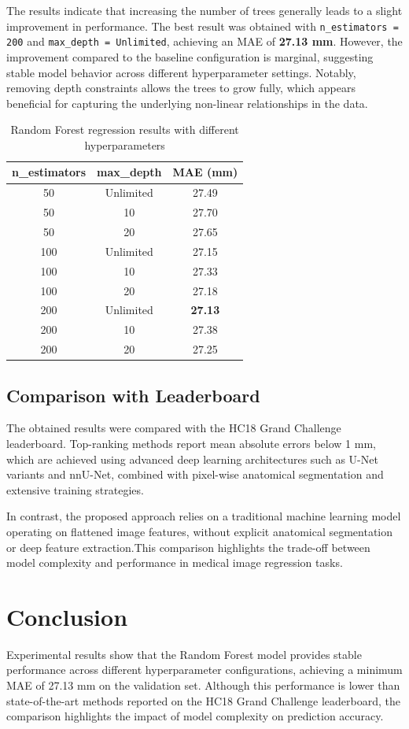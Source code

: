 \documentclass{IEEEtran}
\begin{document}
The results indicate that increasing the number of trees generally leads to a slight improvement in performance. The best result was obtained with \texttt{n\_estimators = 200} and \texttt{max\_depth = Unlimited}, achieving an MAE of \textbf{27.13 mm}. However, the improvement compared to the baseline configuration is marginal, suggesting stable model behavior across different hyperparameter settings. Notably, removing depth constraints allows the trees to grow fully, which appears beneficial for capturing the underlying non-linear relationships in the data.
\begin{table}[h!]
\centering
\caption{Random Forest regression results with different hyperparameters}
\label{tab:rf_results}
\begin{tabular}{ccc}
\hline
n\_estimators & max\_depth & MAE (mm) \\
\hline
50  & Unlimited & 27.49 \\
50  & 10   & 27.70 \\
50  & 20   & 27.65 \\
100 & Unlimited & 27.15 \\
100 & 10   & 27.33 \\
100 & 20   & 27.18 \\
200 & Unlimited & \textbf{27.13} \\
200 & 10   & 27.38 \\
200 & 20   & 27.25 \\
\hline
\end{tabular}
\end{table}
\subsection{Comparison with Leaderboard}

The obtained results were compared with the HC18 Grand Challenge leaderboard. Top-ranking methods report mean absolute errors below 1 mm, which are achieved using advanced deep learning architectures such as U-Net variants and nnU-Net, combined with pixel-wise anatomical segmentation and extensive training strategies.

In contrast, the proposed approach relies on a traditional machine learning model operating on flattened image features, without explicit anatomical segmentation or deep feature extraction.This comparison highlights the trade-off between model complexity and performance in medical image regression tasks.

\section{Conclusion}
Experimental results show that the Random Forest model provides stable performance across different hyperparameter configurations, achieving a minimum MAE of 27.13 mm on the validation set. Although this performance is lower than state-of-the-art methods reported on the HC18 Grand Challenge leaderboard, the comparison highlights the impact of model complexity on prediction accuracy.
\end{document}
